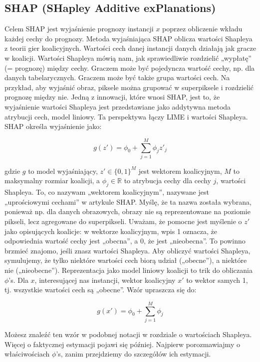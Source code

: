 \subsection{SHAP (SHapley Additive exPlanations)}


Celem SHAP jest wyjaśnienie prognozy instancji $x$ poprzez obliczenie wkładu każdej cechy do prognozy. Metoda wyjaśniająca SHAP oblicza wartości Shapleya z teorii gier koalicyjnych. Wartości cech danej instancji danych działają jak gracze w koalicji. Wartości Shapleya mówią nam, jak sprawiedliwie rozdzielić „wypłatę” (= prognozę) między cechy. Graczem może być pojedyncza wartość cechy, np. dla danych tabelarycznych. Graczem może być także grupa wartości cech. Na przykład, aby wyjaśnić obraz, piksele można grupować w superpiksele i rozdzielić prognozę między nie. Jedną z innowacji, które wnosi SHAP, jest to, że wyjaśnienie wartości Shapleya jest przedstawiane jako addytywna metoda atrybucji cech, model liniowy. Ta perspektywa łączy LIME i wartości Shapleya. SHAP określa wyjaśnienie jako:

\[
g(z') = \phi_0 + \sum_{j=1}^M \phi_j z'_j
\]

gdzie $g$ to model wyjaśniający, $z' \in \{0,1\}^M$ jest wektorem koalicyjnym, $M$ to maksymalny rozmiar koalicji, a $\phi_j \in \mathbb{R}$ to atrybucja cechy dla cechy $j$, wartości Shapleya. To, co nazywam „wektorem koalicyjnym”, nazywane jest „uprościowymi cechami” w artykule SHAP. Myślę, że ta nazwa została wybrana, ponieważ np. dla danych obrazowych, obrazy nie są reprezentowane na poziomie pikseli, lecz agregowane do superpikseli. Uważam, że pomocne jest myślenie o $z'$ jako opisujących koalicje: w wektorze koalicyjnym, wpis 1 oznacza, że odpowiednia wartość cechy jest „obecna”, a 0, że jest „nieobecna”. To powinno brzmieć znajomo, jeśli znasz wartości Shapleya. Aby obliczyć wartości Shapleya, symulujemy, że tylko niektóre wartości cech biorą udział („obecne”), a niektóre nie („nieobecne”). Reprezentacja jako model liniowy koalicji to trik do obliczania $\phi$’s. Dla $x$, interesującej nas instancji, wektor koalicyjny $x'$ to wektor samych 1, tj. wszystkie wartości cech są „obecne”. Wzór upraszcza się do:

\[
g(x') = \phi_0 + \sum_{j=1}^M \phi_j
\]

Możesz znaleźć ten wzór w podobnej notacji w rozdziale o wartościach Shapleya. Więcej o faktycznej estymacji pojawi się później. Najpierw porozmawiajmy o właściwościach $\phi$’s, zanim przejdziemy do szczegółów ich estymacji.

